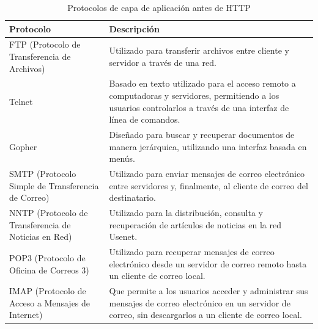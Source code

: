 \begin{table}[h!]
      \small
      \centering
      \begin{tabular}{>{\raggedright}m{3cm}m{10cm}}
            \toprule
            \textbf{Protocolo}                                   & \textbf{Descripción}                                                                                                                                                \\
            \midrule
            FTP (Protocolo de Transferencia de Archivos)         & Utilizado para transferir archivos entre cliente y servidor a través de una red.                                                                                    \\
            \addlinespace
            Telnet                                               & Basado en texto utilizado para el acceso remoto a computadoras y servidores, permitiendo a los usuarios controlarlos a través de una interfaz de línea de comandos. \\
            \addlinespace
            Gopher                                               & Diseñado para buscar y recuperar documentos de manera jerárquica, utilizando una interfaz basada en menús.                                                          \\
            \addlinespace
            SMTP (Protocolo Simple de Transferencia de Correo)   & Utilizado para enviar mensajes de correo electrónico entre servidores y, finalmente, al cliente de correo del destinatario.                                         \\
            \addlinespace
            NNTP (Protocolo de Transferencia de Noticias en Red) & Utilizado para la distribución, consulta y recuperación de artículos de noticias en la red Usenet.                                                                  \\
            \addlinespace
            POP3 (Protocolo de Oficina de Correos 3)             & Utilizado para recuperar mensajes de correo electrónico desde un servidor de correo remoto hasta un cliente de correo local.                                        \\
            \addlinespace
            IMAP (Protocolo de Acceso a Mensajes de Internet)    & Que permite a los usuarios acceder y administrar sus mensajes de correo electrónico en un servidor de correo, sin descargarlos a un cliente de correo local.        \\
            \bottomrule
      \end{tabular}
      \caption{Protocolos de capa de aplicación antes de HTTP}
      \label{fig:evolucion-protocolos}
\end{table}

